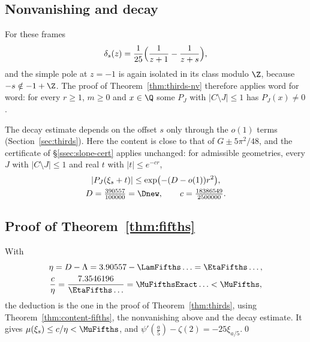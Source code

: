 \subsection{Nonvanishing and decay}
For these frames
\[
 \delta_s(z)=\frac1{25}\Bigl(\frac1{z+1}-\frac1{z+s}\Bigr),
\]
and the simple pole at $z=-1$ is again isolated in its class modulo $\Z$, because $-s\notin-1+\Z$. The proof of Theorem~\ref{thm:thirds-nv}
therefore applies word for word: for every $r\ge1$, $m\ge0$ and $x\in\Q$ some $P_J$ with $|C\setminus J|\le1$ has $P_J(x)\ne0$.

The decay estimate depends on the offset $s$ only through the $o(1)$ terms (Section~\ref{sec:thirds}). Here the content is close to that of
$G\pm5\pi^2/48$, and the certificate of \S\ref{ssec:slope-cert} applies unchanged: for admissible geometries, every $J$ with $|C\setminus J|\le1$
and real $t$ with $|t|\le e^{-cr}$,
\[
\begin{gathered}
 |P_J(\xi_s+t)|\le\exp\bigl(-(D-o(1))r^2\bigr),\\
 D=\tfrac{390557}{100000}=\Dnew,\qquad c=\tfrac{18386549}{2500000}.
\end{gathered}
\]

\subsection{Proof of Theorem~\ref{thm:fifths}}
With
\[
\begin{gathered}
 \eta=D-\Lambda=3.90557-\LamFifths\ldots=\EtaFifths\ldots,\\
 \frac c\eta=\frac{7.3546196}{\EtaFifths\ldots}=\MuFifthsExact\ldots<\MuFifths ,
\end{gathered}
\]
the deduction is the one in the proof of Theorem~\ref{thm:thirds}, using Theorem~\ref{thm:content-fifths}, the nonvanishing above and the decay estimate. It gives
$\mu(\xi_s)\le c/\eta<\MuFifths$, and $\psi'(\frac a5)-\zeta(2)=-25\xi_{a/5}$.\qed

